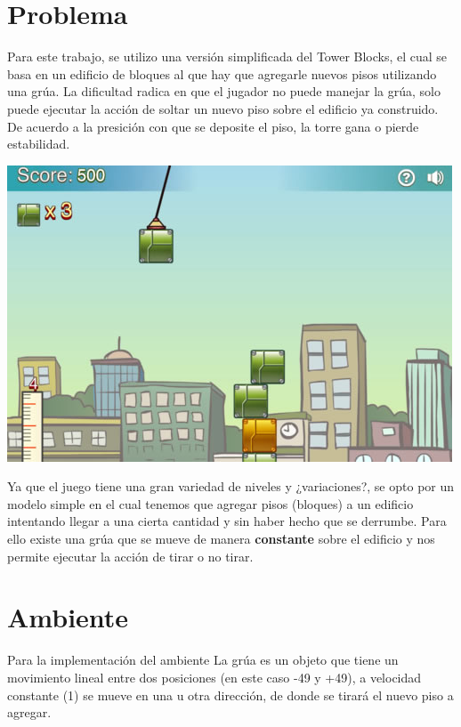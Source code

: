 \documentclass[11pt, a4paper]{article}
\begin{document}
	\maketitle

\section{Problema}
Para este trabajo, se utilizo una versi\'on simplificada del Tower Blocks, el cual se basa en un edificio de bloques al que hay que agregarle nuevos pisos utilizando una gr\'ua. La dificultad radica en que el jugador no puede manejar la gr\'ua, solo puede ejecutar la acci\'on de soltar un nuevo piso sobre el edificio ya construido. De acuerdo a la presici\'on con que se deposite el piso, la torre gana o pierde estabilidad. 
\begin{center} \includegraphics[scale=0.50]{towerblocks}\end{center}

Ya que el juego tiene una gran variedad de niveles y ¿variaciones?, se opto por un modelo simple en el cual tenemos que agregar pisos (bloques) a un edificio intentando llegar a una cierta cantidad y sin haber hecho que se derrumbe. Para ello existe una gr\'ua que se mueve de manera \textbf{constante} sobre el edificio y nos permite ejecutar la acci\'on de tirar o no tirar.

\section{Ambiente}
Para la implementaci\'on del ambiente
La grúa es un objeto que tiene un movimiento lineal entre dos posiciones (en este caso -49 y +49), a velocidad constante (1) se mueve en una u otra dirección, de donde se tirará el nuevo piso a agregar. 
\end{document}
